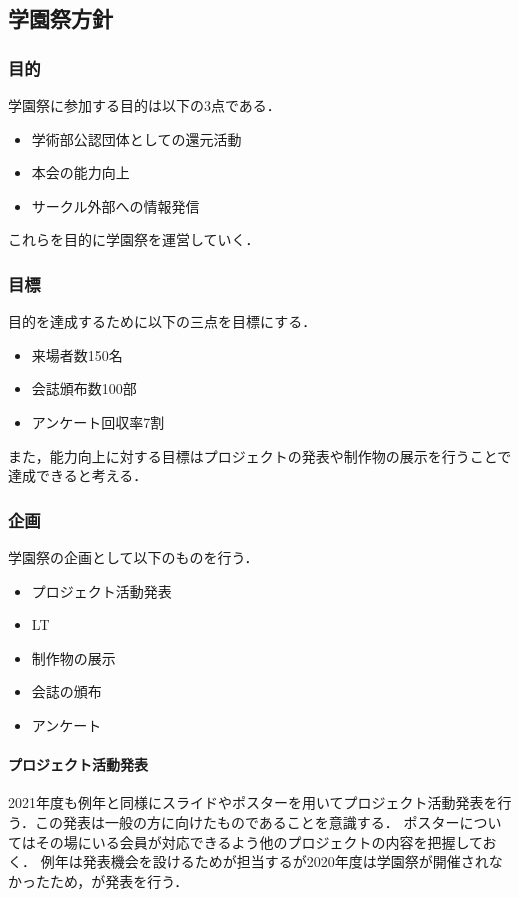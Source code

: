 \subsection*{学園祭方針}


\subsubsection*{目的}
学園祭に参加する目的は以下の3点である．
\begin{itemize}
    \item 学術部公認団体としての還元活動
    \item 本会の能力向上
    \item サークル外部への情報発信
\end{itemize}
これらを目的に学園祭を運営していく．
\subsubsection*{目標}
目的を達成するために以下の三点を目標にする．
\begin{itemize}
    \item 来場者数150名
    \item 会誌頒布数100部
    \item アンケート回収率7割
\end{itemize}
また，能力向上に対する目標はプロジェクトの発表や制作物の展示を行うことで達成できると考える．
\subsubsection*{企画}
学園祭の企画として以下のものを行う．
\begin{itemize}
    \item プロジェクト活動発表
    \item LT
    \item 制作物の展示
    \item 会誌の頒布
    \item アンケート
\end{itemize}
\paragraph{プロジェクト活動発表}
2021年度も例年と同様にスライドやポスターを用いてプロジェクト活動発表を行う．この発表は一般の方に向けたものであることを意識する．
ポスターについてはその場にいる会員が対応できるよう他のプロジェクトの内容を把握しておく．
例年は発表機会を設けるため\firstGrade{}が担当するが2020年度は学園祭が開催されなかったため\firstGrade{}，\secondGrade{}が発表を行う．
